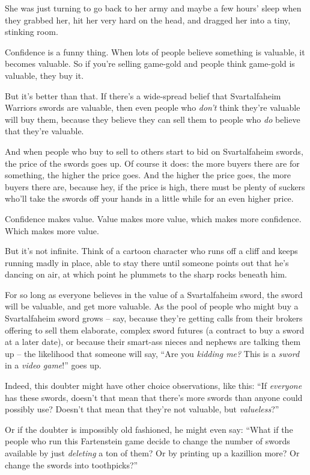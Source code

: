 She was just turning to go back to her army and maybe a few hours'
sleep when they grabbed her, hit her very hard on the head, and
dragged her into a tiny, stinking room.

\tb

Confidence is a funny thing. When lots of people believe something
is valuable, it becomes valuable. So if you're selling game-gold
and people think game-gold is valuable, they buy it.

But it's better than that. If there's a wide-spread belief that
Svartalfaheim Warriors swords are valuable, then even people who
\emph{don't} think they're valuable will buy them, because they
believe they can sell them to people who \emph{do} believe that
they're valuable.

And when people who buy to sell to others start to bid on
Svartalfaheim swords, the price of the swords goes up. Of course it
does: the more buyers there are for something, the higher the price
goes. And the higher the price goes, the more buyers there are,
because hey, if the price is high, there must be plenty of suckers
who'll take the swords off your hands in a little while for an even
higher price.

Confidence makes value. Value makes more value, which makes more
confidence. Which makes more value.

But it's not infinite. Think of a cartoon character who runs off a
cliff and keeps running madly in place, able to stay there until
someone points out that he's dancing on air, at which point he
plummets to the sharp rocks beneath him.

For so long as everyone believes in the value of a Svartalfaheim
sword, the sword will be valuable, and get more valuable. As the
pool of people who might buy a Svartalfaheim sword grows -- say,
because they're getting calls from their brokers offering to sell
them elaborate, complex sword futures (a contract to buy a sword at
a later date), or because their smart-ass nieces and nephews are
talking them up -- the likelihood that someone will say, ``Are you
\emph{kidding me?} This is a \emph{sword} in a \emph{video game}!''
goes up.

Indeed, this doubter might have other choice observations, like
this: ``If \emph{everyone} has these swords, doesn't that mean that
there's more swords than anyone could possibly use? Doesn't that
mean that they're not valuable, but \emph{valueless}?''

Or if the doubter is impossibly old fashioned, he might even say:
``What if the people who run this Fartenstein game decide to change
the number of swords available by just \emph{deleting} a ton of
them? Or by printing up a kazillion more? Or change the swords into
toothpicks?''

